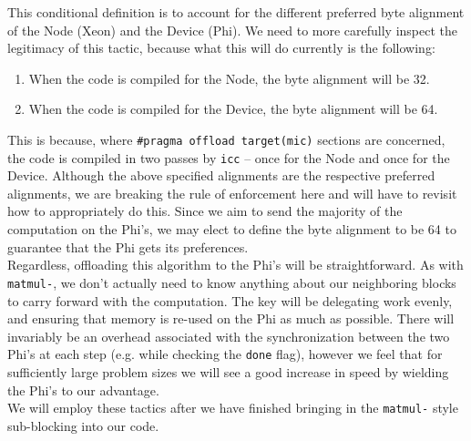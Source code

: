 \documentclass[11pt]{article}
\begin{document}
\noindent This conditional definition is to account for the different preferred byte alignment of the Node (Xeon) and the Device (Phi).  We need to more carefully inspect the legitimacy of this tactic, because what this will do currently is the following:

\begin{enumerate}[1.]
  \item When the code is compiled for the Node, the byte alignment will be 32.
  \item When the code is compiled for the Device, the byte alignment will be 64.
\end{enumerate}

\noindent This is because, where \texttt{\#pragma offload target(mic)} sections are concerned, the code is compiled in two passes by \texttt{icc} -- once for the Node and once for the Device.  Although the above specified alignments are the respective preferred alignments, we are breaking the rule of enforcement here and will have to revisit how to appropriately do this.  Since we aim to send the majority of the computation on the Phi's, we may elect to define the byte alignment to be 64 to guarantee that the Phi gets its preferences.\\

\noindent Regardless, offloading this algorithm to the Phi's will be straightforward.  As with \texttt{matmul-}, we don't actually need to know anything about our neighboring blocks to carry forward with the computation.  The key will be delegating work evenly, and ensuring that memory is re-used on the Phi as much as possible.  There will invariably be an overhead associated with the synchronization between the two Phi's at each step (e.g. while checking the \texttt{done} flag), however we feel that for sufficiently large problem sizes we will see a good increase in speed by wielding the Phi's to our advantage.\\

\noindent We will employ these tactics after we have finished bringing in the \texttt{matmul-} style sub-blocking into our code.

\end{document}
